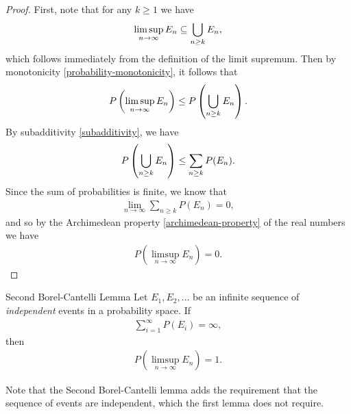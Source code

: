 \begin{proof}
    First, note that for any $k \geq 1$ we have
    \begin{align*}
        \limsup_{n \to \infty}E_n \subseteq \bigcup_{n \geq k}E_n,
    \end{align*}
    which follows immediately from the definition of the limit supremum. Then by monotonicity \ref{probability-monotonicity}, it follows that
    \begin{align*}
        P\left(\limsup_{n\to\infty}E_n\right) \leq P\left(\bigcup_{n \geq k}E_n\right).
    \end{align*}
    By subadditivity \ref{subadditivity}, we have
    \begin{align*}
        P\left(\bigcup_{n \geq k}E_n\right) \leq \sum_{n \geq k}P(E_n).
    \end{align*}
    Since the sum of probabilities is finite, we know that
    \begin{align*}
        \lim_{n\to\infty}\sum_{n \geq k}P(E_n) = 0,
    \end{align*}
    and so by the Archimedean property \ref{archimedean-property} of the real numbers we have
    \begin{align*}
        P\left(\limsup_{n\to\infty}E_n\right) = 0.
    \end{align*}
\end{proof}

\begin{lemma}{Second Borel-Cantelli Lemma}\label{borel-cantelli-two}\proofbreak
    Let $E_1, E_2, \ldots$ be an infinite sequence of \emph{independent} events in a probability space. If
    \begin{align*}
        \sum_{i=1}^{\infty}P(E_i) = \infty,
    \end{align*}
    then
    \begin{align*}
        P\left(\limsup_{n \to \infty}E_n\right) = 1.
    \end{align*}
\end{lemma}

\begin{rmk}
    Note that the Second Borel-Cantelli lemma adds the requirement that the sequence of events are independent, which the first lemma does not require.
\end{rmk}

